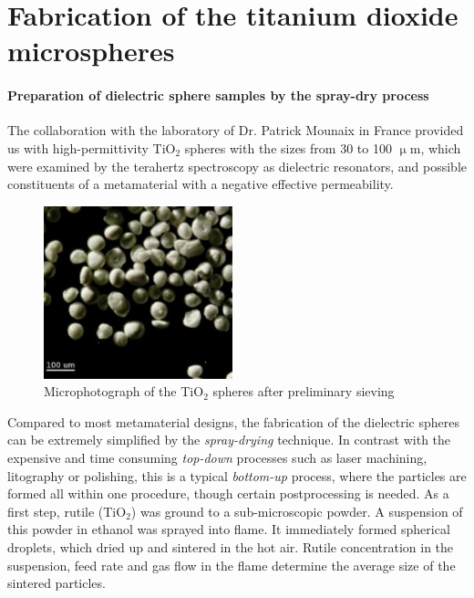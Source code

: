 \section{Fabrication of the titanium dioxide microspheres}
\paragraph{Preparation of dielectric sphere samples by the spray-dry process}%
The collaboration with the laboratory of Dr. Patrick Mounaix in France %
provided us with high-permittivity TiO$_{2}$ spheres with the sizes from 30 to 100 $\upmu$m, which were examined by the terahertz spectroscopy as dielectric resonators, and possible constituents of a metamaterial with a negative effective permeability.
\begin{figure}[ht] \caption{Microphotograph of the TiO$_{2}$ spheres after preliminary sieving} \label{fg_microphoto} \centering 
\includegraphics[height=5cm]{img/microscope_TiO2_particles.pdf}
\end{figure}

Compared to most metamaterial designs, the fabrication of the dielectric spheres can be extremely simplified by the \textit{spray-drying} technique. In contrast with the expensive and time consuming \textit{top-down} processes such as laser machining, litography or polishing, this is a typical \textit{bottom-up} process, where the particles are formed all within one procedure, though certain postprocessing is needed. 
As a first step, rutile (TiO$_{2}$) was ground to a sub-microscopic powder. A suspension of this powder in ethanol was sprayed into flame. It immediately formed spherical droplets, which dried up and sintered in the hot air. Rutile concentration in the suspension, feed rate and gas flow in the flame determine the average size of the sintered particles.

